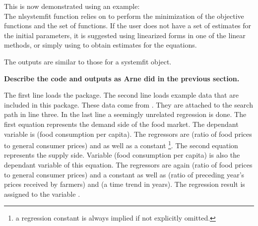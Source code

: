 
This is now demonstrated using an example: \\



The nlsystemfit function relies on  to perform the
minimization of the objective functions and the  set of
functions. If the user does not have a set of estimates for the
initial parameters, it is suggested using linearized forms in one of
the linear methods, or simply using  to obtain estimates for
the equations. 

The outputs are similar to those for a systemfit object. 

\textbf{Describe the code and outputs as Arne did in the previous
  section.}

The first line loads the  package. 
The second line loads example data that are included in this package.
These data come from \cite{kmenta86}.
They are attached to the  search path in line three.
In the last line a seemingly unrelated regression is done.
The first equation represents the demand side of the food market.
The dependant variable is  (food consumption per capita). 
The regressors are  (ratio of food prices to general consumer prices)
and  as well as a constant%
\footnote{a regression constant is always implied if not explicitly omitted.}.
The second equation represents the supply side.
Variable  (food consumption per capita) is also the dependant 
variable of this equation. 
The regressors are again  (ratio of food prices to general 
consumer prices) and a constant as well as 
 (ratio of preceding year's prices received by farmers) and 
 (a time trend in years).
The regression result is assigned to the variable .

